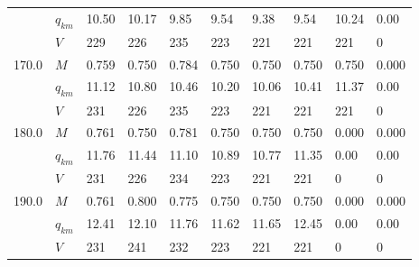 \begin{tabular}{llllllllll}
      & $q_{km}$ &  10.50  &  10.17  &   9.85  &   9.54  &   9.38  &                    9.54  &                   10.24  &   0.00 \cellcolor{green} \\
      & $V$ &    229  &    226  &    235  &    223  &    221  &                     221  &                     221  &      0 \cellcolor{green} \\
170.0 & $M$ &  0.759  &  0.750  &  0.784  &  0.750  &  0.750  &                   0.750  &                   0.750  &  0.000 \cellcolor{green} \\
      & $q_{km}$ &  11.12  &  10.80  &  10.46  &  10.20  &  10.06  &                   10.41  &                   11.37  &   0.00 \cellcolor{green} \\
      & $V$ &    231  &    226  &    235  &    223  &    221  &                     221  &                     221  &      0 \cellcolor{green} \\
180.0 & $M$ &  0.761  &  0.750  &  0.781  &  0.750  &  0.750  &                   0.750  &  0.000 \cellcolor{green} &                   0.000  \\
      & $q_{km}$ &  11.76  &  11.44  &  11.10  &  10.89  &  10.77  &                   11.35  &   0.00 \cellcolor{green} &                    0.00  \\
      & $V$ &    231  &    226  &    234  &    223  &    221  &                     221  &      0 \cellcolor{green} &                       0  \\
190.0 & $M$ &  0.761  &  0.800  &  0.775  &  0.750  &  0.750  &                   0.750  &  0.000 \cellcolor{green} &                   0.000  \\
      & $q_{km}$ &  12.41  &  12.10  &  11.76  &  11.62  &  11.65  &                   12.45  &   0.00 \cellcolor{green} &                    0.00  \\
      & $V$ &    231  &    241  &    232  &    223  &    221  &                     221  &      0 \cellcolor{green} &                       0  \\
\bottomrule
\end{tabular}
